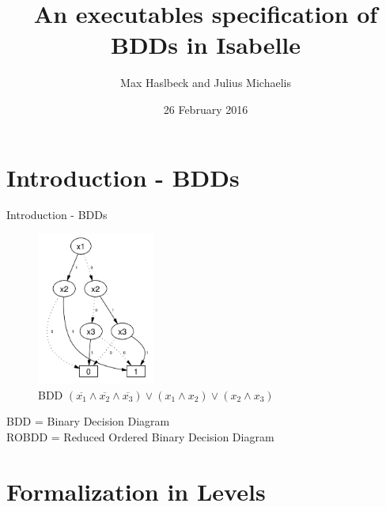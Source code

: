 \documentclass[%
	sans,
	12pt,
]{beamer}
\title{An executables specification of BDDs in Isabelle}
\author{\normalsize Max Haslbeck and Julius Michaelis}
\institute[]{\footnotesize Fakultät für Informatik\\TU München}
\date{\footnotesize 26 February 2016}
\begin{document}
\maketitle

\section{Introduction - BDDs}
\begin{frame}{Introduction - BDDs}
  \begin{center}
\begin{figure}[htbp]
  \centering
  \includegraphics[height=5cm]{img/BDD_simple.png}
  \caption{BDD $(\overline{x_1} \land \overline{x_2} \land \overline{x_3}) \lor
  (x_1 \land x_2) \lor (x_2 \land x_3) $}
\end{figure}
  BDD = Binary Decision Diagram \\
  ROBDD = Reduced Ordered Binary Decision Diagram
  \end{center}
\end{frame}


\section{Formalization in Levels}
\end{document}
